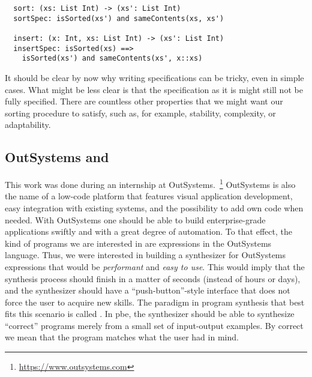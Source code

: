 \begin{lstlisting}
  sort: (xs: List Int) -> (xs': List Int)
  sortSpec: isSorted(xs') and sameContents(xs, xs')

  insert: (x: Int, xs: List Int) -> (xs': List Int)
  insertSpec: isSorted(xs) ==>
    isSorted(xs') and sameContents(xs', x::xs)
\end{lstlisting}

It should be clear by now why writing specifications can be tricky, even in
simple cases.
What might be less clear is that the specification as it is might still not be
fully specified.
There are countless other properties that we might want our sorting procedure to
satisfy, such as, for example, stability, complexity, or adaptability.

\subsection{OutSystems and }
\label{sec:outsystems-pbe}

This work was done during an internship at
OutSystems.~\footnote{\url{https://www.outsystems.com}} 
OutSystems is also the name of a low-code platform that features visual
application development, easy integration with existing systems, and the
possibility to add own code when needed.
With OutSystems one should be able to build enterprise-grade applications
swiftly and with a great degree of
automation.\footnotemark
{}
To that effect, the kind of programs we are interested in are expressions in the
OutSystems language.\footnotemark
{}
Thus, we were interested in building a synthesizer for OutSystems expressions
that would be \textit{performant} and \textit{easy to use}.
This would imply that the synthesis process should finish in a matter of seconds
(instead of hours or days), and the synthesizer should have a
``push-button''-style interface that does not force the user to acquire new
skills.
The paradigm in program synthesis that best fits this scenario is called
.
In \gls{pbe}, the synthesizer should be able to synthesize ``correct'' programs
merely from a small set of input-output examples.
By correct we mean that the program matches what the user had in mind.

